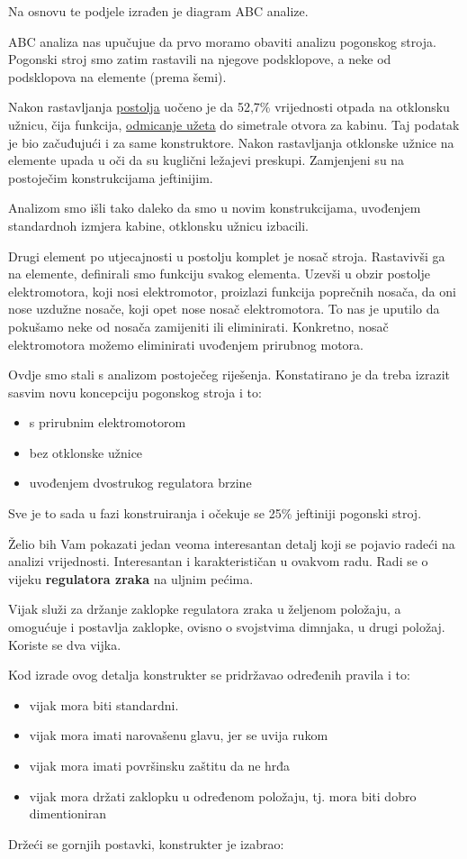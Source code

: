 \documentclass[a4paper,12pt]{article}
\numberwithin{figure}{section}
\begin{document}
Na osnovu te podjele izrađen je diagram ABC analize.\par
ABC analiza nas upučujue da prvo moramo obaviti analizu pogonskog stroja. Pogonski stroj smo zatim rastavili na njegove podsklopove, a neke od podsklopova na elemente (prema šemi).\par
Nakon rastavljanja \underline{postolja} uočeno je da 52,7\% vrijednosti otpada na otklonsku užnicu, čija funkcija, \underline{odmicanje užeta} do simetrale otvora za kabinu. Taj podatak je bio začuđujući i za same konstruktore. Nakon rastavljanja otklonske užnice na elemente upada u oči da su kuglični ležajevi preskupi. Zamjenjeni su na postoječim konstrukcijama jeftinijim.\par
Analizom smo išli tako daleko da smo u novim konstrukcijama, uvođenjem standardnoh izmjera kabine, otklonsku užnicu izbacili.\par
Drugi element po utjecajnosti u postolju komplet je nosač stroja. Rastavivši ga na elemente, definirali smo funkciju svakog elementa. Uzevši u obzir postolje elektromotora, koji nosi elektromotor, proizlazi funkcija poprečnih nosača, da oni nose uzdužne nosače, koji opet nose nosač elektromotora. To nas je uputilo da pokušamo neke od nosača zamijeniti ili eliminirati. Konkretno, nosač elektromotora možemo eliminirati uvođenjem prirubnog motora.\par
Ovdje smo stali s analizom postoječeg riješenja. Konstatirano je da treba izrazit sasvim novu koncepciju pogonskog stroja i to:
\begin{itemize}
\item s prirubnim elektromotorom
\item bez otklonske užnice
\item uvođenjem dvostrukog regulatora brzine
\end{itemize}
Sve je to sada u fazi konstruiranja i očekuje se 25\% jeftiniji pogonski stroj.







Želio bih Vam pokazati jedan veoma interesantan detalj koji se pojavio radeći na analizi vrijednosti. Interesantan i karakterističan u ovakvom radu. Radi se o vijeku \textbf{regulatora zraka} na uljnim pećima.\par
Vijak služi za držanje zaklopke regulatora zraka u željenom položaju, a omogućuje i postavlja zaklopke, ovisno o svojstvima dimnjaka, u drugi položaj. Koriste se dva vijka.\par
Kod izrade ovog detalja konstrukter se pridržavao određenih pravila i to:
\begin{itemize}
\item vijak mora biti standardni.
\item vijak mora imati narovašenu glavu, jer se uvija rukom
\item vijak mora imati površinsku zaštitu da ne hrđa
\item vijak mora držati zaklopku u određenom položaju, tj. mora biti dobro dimentioniran
\end{itemize}
Držeći se gornjih postavki, konstrukter je izabrao:
\end{document}
